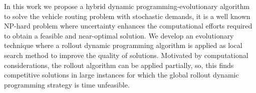 \documentclass[tesis,reqno]{unaltesis2}
\begin{document}

















\maketitle \Preliminares \PaginaDeAprobacion

\onehalfspacing
\begin{resumen}
In this work we propose a hybrid dynamic programming-evolutionary algorithm to solve the vehicle routing problem with stochastic demands, it is a well known NP-hard problem where uncertainty enhances the computational efforts required to obtain a feasible and near-optimal solution. We develop an evolutionary technique where a rollout dynamic programming algorithm is applied as local search method to improve the quality of solutions. Motivated by computational considerations, the rollout algorithm can be applied partially, so, this finds competitive solutions in large instances for which the global rollout dynamic programming strategy is time unfeasible.
\\
\end{resumen}
\end{document}
